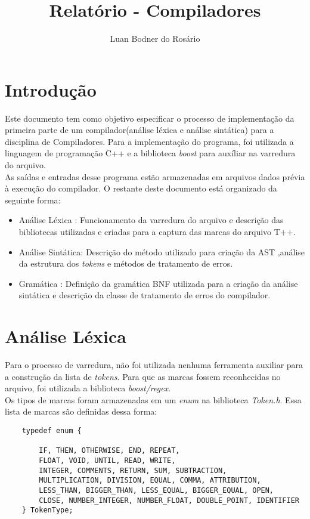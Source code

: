 \documentclass[12pt,a4paper,final]{article}
\author{Luan Bodner do Rosário}
\title{Relatório - Compiladores}
\begin{document}
\maketitle
\section*{Introdução}
Este documento tem como objetivo especificar o processo de implementação da primeira parte de um compilador(análise léxica e análise sintática) para a disciplina de Compiladores.
Para a implementação do programa, foi utilizada a linguagem de programação C++ e a biblioteca \textit{boost} para auxíliar na varredura do arquivo.\\
As saídas e entradas desse programa estão armazenadas em arquivos dados prévia à execução do compilador.
O restante deste documento está organizado da seguinte forma:
\begin{itemize}
\item Análise Léxica : Funcionamento da varredura do arquivo e descrição das bibliotecas utilizadas e criadas para a captura das marcas do arquivo T++.
\item Análise Sintática: Descrição do método utilizado para criação da AST ,análise da estrutura dos \textit{tokens} e métodos de tratamento de erros.
\item Gramática : Definição da gramática BNF utilizada para a criação da análise sintática e descrição da classe de tratamento de erros do compilador.
\end{itemize}

\section*{Análise Léxica}
Para o processo de varredura, não foi utilizada nenhuma ferramenta auxiliar para a construção da lista de \textit{tokens}. Para que as marcas fossem reconhecidas no arquivo, foi utilizada a biblioteca \textit{boost/regex}.\\

Os tipos de marcas foram armazenadas em um \textit{enum} na biblioteca \textit{Token.h}. Essa lista de marcas são definidas dessa forma:
\\

\begin{lstlisting}
    typedef enum {
    
        IF, THEN, OTHERWISE, END, REPEAT,
        FLOAT, VOID, UNTIL, READ, WRITE,
        INTEGER, COMMENTS, RETURN, SUM, SUBTRACTION,
        MULTIPLICATION, DIVISION, EQUAL, COMMA, ATTRIBUTION,
        LESS_THAN, BIGGER_THAN, LESS_EQUAL, BIGGER_EQUAL, OPEN,
        CLOSE, NUMBER_INTEGER, NUMBER_FLOAT, DOUBLE_POINT, IDENTIFIER
    } TokenType;
\end{lstlisting}
\end{document}
